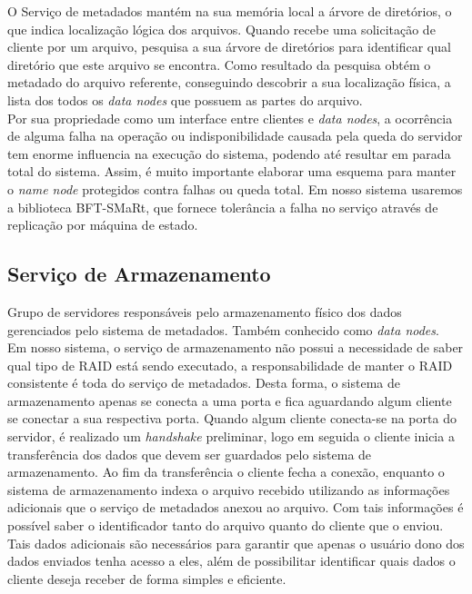 		O Serviço de metadados mantém na sua memória local a árvore de diretórios, o que indica localização lógica dos arquivos. Quando recebe uma solicitação de cliente por um arquivo, pesquisa a sua árvore de diretórios para identificar qual diretório que este arquivo se encontra. Como resultado da pesquisa obtém o metadado do arquivo referente, conseguindo descobrir a sua localização física, a lista dos todos os \textit{data nodes} que possuem as partes do arquivo.
		\\
		
		Por sua propriedade como um interface entre clientes e \textit{data nodes}, a ocorrência de alguma falha na operação ou indisponibilidade causada pela queda do servidor tem  enorme influencia na execução do sistema, podendo até resultar em parada total do sistema. Assim, é muito importante elaborar uma esquema para manter o \textit{name node} protegidos contra falhas ou queda total. Em nosso sistema usaremos a biblioteca BFT-SMaRt, que fornece tolerância a falha no serviço através de replicação por máquina de estado. \\
	
	\subsection{Serviço de Armazenamento}
		Grupo de servidores responsáveis pelo armazenamento físico dos dados gerenciados pelo sistema de metadados. Também conhecido como \textit{data nodes}.\\
		
		Em nosso sistema, o serviço de armazenamento não possui a necessidade de saber qual tipo de RAID está sendo executado, a responsabilidade de manter o RAID consistente é toda do serviço de metadados. Desta forma, o sistema de armazenamento apenas se conecta a uma porta e fica aguardando algum cliente se conectar a sua respectiva porta. Quando algum cliente conecta-se na porta do servidor, é realizado um \textit{handshake} preliminar, logo em seguida o cliente inicia a transferência dos dados que devem ser guardados pelo sistema de armazenamento. Ao fim da transferência o cliente fecha a conexão, enquanto o sistema de armazenamento indexa o arquivo recebido utilizando as informações adicionais que o serviço de metadados anexou ao arquivo. Com tais informações é possível saber o identificador tanto do arquivo quanto do cliente que o enviou. Tais dados adicionais são necessários para garantir que apenas o usuário dono dos dados enviados tenha acesso a eles, além de possibilitar identificar quais dados o cliente deseja receber de forma simples e eficiente.  
		\\
	
